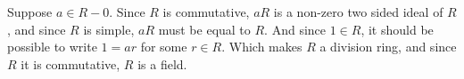 Suppose $a \in R - 0$. Since $R$ is commutative, $aR$ is a non-zero two sided ideal of $R$, and since $R$ is simple, $aR$ must be equal to $R$. And since $1 \in R$, it should be possible to write $1=ar$ for some $r \in R$. Which makes $R$ a division ring, and since $R$ it is commutative, $R$ is a field.
